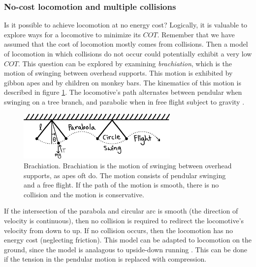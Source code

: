 \subsubsection*{No-cost locomotion and multiple collisions}

Is it possible to achieve locomotion at no energy cost?  Logically, it is valuable to explore ways for a locomotive to minimize its $COT$. Remember that we have assumed that the cost of locomotion mostly comes from collisions. Then a model of locomotion in which collisions do not occur could potentially exhibit a very low $COT$. This question can be explored by examining \textit{brachiation}, which is the motion of swinging between overhead supports. This motion is exhibited by gibbon apes and by children on monkey bars. The kinematics of this motion is described in figure \ref{fig:Brachiation}. The locomotive's path alternates between pendular when swinging on a tree branch, and parabolic when in free flight subject to gravity \cite{bertram99}.

\begin{figure}[h]		%
\begin{centering}
\includegraphics[width=0.7\textwidth]{Figures/Brachiation}\par
\end{centering}
\caption[Diagram: Brachiation]{Brachiation. Brachiation is the motion of swinging between overhead supports, as apes oft do. The motion consists of pendular swinging and a free flight. If the path of the motion is smooth, there is no collision and the motion is conservative.}
\label{fig:Brachiation}
\end{figure}
%
If the intersection of the parabola and circular arc is smooth (the direction of velocity is continuous), then no collision is required to redirect the locomotive's velocity from down to up. If no collision occurs, then the locomotion has no energy cost (neglecting friction). This model can be adapted to locomotion on the ground, since the model is analagous to upside-down running \cite{ruina05}. This can be done if the tension in the pendular motion is replaced with compression.

